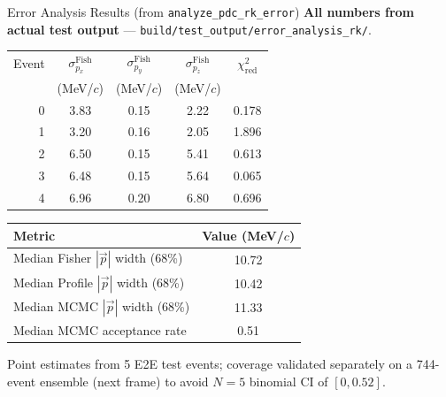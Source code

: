 \documentclass[aspectratio=169]{beamer}
\begin{document}
\begin{frame}{Error Analysis Results (from \texttt{analyze\_pdc\_rk\_error})}
\small
\textbf{All numbers from actual test output} --- \texttt{build/test\_output/error\_analysis\_rk/}.

\begin{table}
\centering
\begin{tabular}{rcccc}
\toprule
Event & $\sigma_{p_x}^\mathrm{Fish}$ & $\sigma_{p_y}^\mathrm{Fish}$ & $\sigma_{p_z}^\mathrm{Fish}$ & $\chi^2_\mathrm{red}$ \\
 & (MeV/$c$) & (MeV/$c$) & (MeV/$c$) & \\
\midrule
0 & 3.83 & 0.15 & 2.22 & 0.178 \\
1 & 3.20 & 0.16 & 2.05 & 1.896 \\
2 & 6.50 & 0.15 & 5.41 & 0.613 \\
3 & 6.48 & 0.15 & 5.64 & 0.065 \\
4 & 6.96 & 0.20 & 6.80 & 0.696 \\
\bottomrule
\end{tabular}
\end{table}

\begin{table}
\centering
\begin{tabular}{lc}
\toprule
Metric & Value (MeV/$c$) \\
\midrule
Median Fisher $|\vec{p}|$ width (68\%) & 10.72 \\
Median Profile $|\vec{p}|$ width (68\%) & 10.42 \\
Median MCMC $|\vec{p}|$ width (68\%) & 11.33 \\
Median MCMC acceptance rate & 0.51 \\
\bottomrule
\end{tabular}
\end{table}

{\footnotesize Point estimates from 5 E2E test events; coverage validated separately on a 744-event ensemble (next frame) to avoid $N=5$ binomial CI of $[0, 0.52]$.}
\end{frame}
\end{document}
